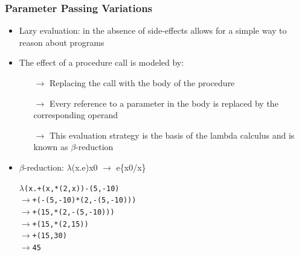 \documentclass{beamer}
\newcommand{\arrow}{\(\rightarrow\)}
\begin{document}
\begin{frame}[fragile]
\frametitle{Parameter Passing Variations}
\begin{scriptsize}
\begin{itemize}
\item<1-> Lazy evaluation: in the absence of side-effects allows for a simple way to reason about programs

\item<2-> The effect of a procedure call is modeled by:
\begin{itemize}
 \item[\arrow] Replacing the call with the body of the procedure
 \item[\arrow] Every reference to a parameter in the body is replaced by the corresponding operand
 \item[\arrow]This evaluation strategy is the basis of the lambda calculus and is known as $\beta$-reduction
\end{itemize}

\item<3-> $\beta$-reduction: $\lambda$(x.e)x0 \arrow{} e\{x0/x\}
\begin{alltt}
\(\lambda\)(x.+(x, *(2, x)) -(5, -10)
\arrow{} +(-(5, -10) *(2, -(5, -10)))
\arrow{} +(15, *(2, -(5, -10)))
\arrow{} +(15, *(2, 15))
\arrow{} +(15, 30)
\arrow{} 45
\end{alltt}

\end{itemize}
\end{scriptsize}
\end{frame}
\end{document}
